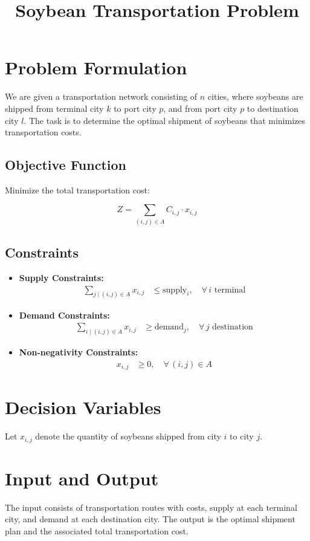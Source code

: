 \documentclass{article}
\begin{document}
\title{Soybean Transportation Problem}
\author{}
\date{}
\maketitle

\section*{Problem Formulation}

We are given a transportation network consisting of $n$ cities, where soybeans are shipped from terminal city $k$ to port city $p$, and from port city $p$ to destination city $l$. The task is to determine the optimal shipment of soybeans that minimizes transportation costs.

\subsection*{Objective Function}

Minimize the total transportation cost:

\[
Z = \sum_{(i,j) \in A} C_{i,j} \cdot x_{i,j}
\]

\subsection*{Constraints}

\begin{itemize}
    \item \textbf{Supply Constraints:}
    \begin{align}
    \sum_{j \mid (i,j) \in A} x_{i,j} &\leq \text{supply}_{i}, \quad \forall \, i \text{ terminal}
    \end{align}

    \item \textbf{Demand Constraints:}
    \begin{align}
    \sum_{i \mid (i,j) \in A} x_{i,j} &\geq \text{demand}_{j}, \quad \forall \, j \text{ destination}
    \end{align}

    \item \textbf{Non-negativity Constraints:}
    \begin{align}
    x_{i,j} &\geq 0, \quad \forall \, (i,j) \in A
    \end{align}
\end{itemize}

\section*{Decision Variables}

Let $x_{i,j}$ denote the quantity of soybeans shipped from city $i$ to city $j$.

\section*{Input and Output}

The input consists of transportation routes with costs, supply at each terminal city, and demand at each destination city. The output is the optimal shipment plan and the associated total transportation cost.
\end{document}
